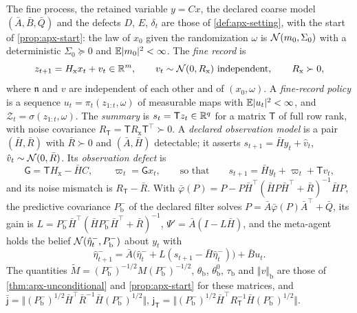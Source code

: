 \begin{definition}\label{def:apx-obs-setting}
The fine process, the retained variable $y=Cx$, the declared coarse model $(\bar A,\bar B,\bar Q)$ and the defects $D$, $E$, $\delta_t$ are those of \cref{def:apx-setting}, with the start of \cref{prop:apx-start}: the law of $x_0$ given the randomization $\omega$ is $\mathcal{N}(m_0,\Sigma_0)$ with a deterministic $\Sigma_0\succeq0$ and $\mathbb{E}\lvert m_0\rvert^2<\infty$. The \emph{fine record} is
\begin{equation}\label{eq:apx-obs-record}
z_{t+1}=H_{\mathrm x}x_t+v_t\in\mathbb{R}^m,\qquad v_t\sim\mathcal{N}(0,R_{\mathrm x})\ \text{independent},\qquad R_{\mathrm x}\succ0,
\end{equation}
where $\mathfrak n$ and $v$ are independent of each other and of $(x_0,\omega)$. A \emph{fine-record policy} is a sequence $u_t=\pi_t(z_{1:t},\omega)$ of measurable maps with $\mathbb{E}\lvert u_t\rvert^2<\infty$, and $\mathcal Z_t=\sigma(z_{1:t},\omega)$. The \emph{summary} is $s_t=\mathsf Tz_t\in\mathbb{R}^q$ for a matrix $\mathsf T$ of full row rank, with noise covariance $R_{\mathsf T}=\mathsf TR_{\mathrm x}\mathsf T^\top\succ0$. A \emph{declared observation model} is a pair $(\bar H,\bar R)$ with $\bar R\succ0$ and $(\bar A,\bar H)$ detectable; it asserts $s_{t+1}=\bar Hy_t+\hat v_t$, $\hat v_t\sim\mathcal{N}(0,\bar R)$. Its \emph{observation defect} is
\begin{equation}\label{eq:apx-obs-defect}
\mathsf G=\mathsf TH_{\mathrm x}-\bar HC,\qquad\varpi_t=\mathsf Gx_t,\qquad\text{so that}\qquad s_{t+1}=\bar Hy_t+\varpi_t+\mathsf Tv_t,
\end{equation}
and its noise mismatch is $R_{\mathsf T}-\bar R$. With $\bar\varphi(P)=P-P\bar H^\top(\bar HP\bar H^\top+\bar R)^{-1}\bar HP$, the predictive covariance $P^-_{\mathrm b}$ of the declared filter solves $P=\bar A\bar\varphi(P)\bar A^\top+\bar Q$, its gain is $L=P^-_{\mathrm b}\bar H^\top(\bar HP^-_{\mathrm b}\bar H^\top+\bar R)^{-1}$, $\Psi'=\bar A(I-L\bar H)$, and the meta-agent holds the belief $\mathcal{N}(\hat\eta^-_t,P^-_{\mathrm b})$ about $y_t$ with
\begin{equation}\label{eq:apx-obs-filter}
\hat\eta^-_{t+1}=\bar A\bigl(\hat\eta^-_t+L(s_{t+1}-\bar H\hat\eta^-_t)\bigr)+\bar Bu_t .
\end{equation}
The quantities $\tilde M=(P^-_{\mathrm b})^{-1/2}M(P^-_{\mathrm b})^{-1/2}$, $\theta_{\mathrm b}$, $\theta^0_{\mathrm b}$, $\tau_{\mathrm b}$ and $\Vert v\Vert_{\mathrm b}$ are those of \cref{thm:apx-unconditional} and \cref{prop:apx-start} for these matrices, and $\bar{\mathsf j}=\Vert(P^-_{\mathrm b})^{1/2}\bar H^\top\bar R^{-1}\bar H(P^-_{\mathrm b})^{1/2}\Vert$, $\mathsf j_{\mathsf T}=\Vert(P^-_{\mathrm b})^{1/2}\bar H^\top R_{\mathsf T}^{-1}\bar H(P^-_{\mathrm b})^{1/2}\Vert$.
\end{definition}

